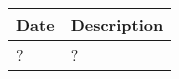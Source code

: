 \begin{center}
    \begin{tabular}{C{4cm}L{10cm}}
        \hline
        \textbf{Date} & \textbf{Description} \\
        \hline
        \rule[-4mm]{0mm}{1cm}
        ? & ? \\
        \hline
    \end{tabular}
\end{center}